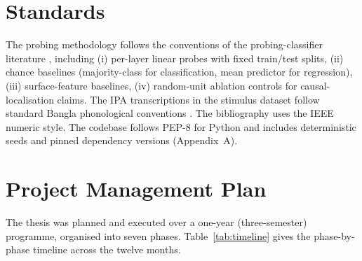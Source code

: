 \section{Standards}

The probing methodology follows the conventions of the probing-classifier literature \cite{conneau2018probing,belinkov2022probing,pimentel2020information}, including (i) per-layer linear probes with fixed train/test splits, (ii) chance baselines (majority-class for classification, mean predictor for regression), (iii) surface-feature baselines, (iv) random-unit ablation controls for causal-localisation claims. The IPA transcriptions in the stimulus dataset follow standard Bangla phonological conventions \cite{nag2014dyslexia}. The bibliography uses the IEEE numeric style. The codebase follows PEP-8 for Python and includes deterministic seeds and pinned dependency versions (Appendix~A).

\section{Project Management Plan}

The thesis was planned and executed over a one-year (three-semester) programme, organised into seven phases. Table~\ref{tab:timeline} gives the phase-by-phase timeline across the twelve months.

\begin{table}[H]
\centering
\caption{One-year thesis timeline. Phases overlap at their boundaries; writing runs in parallel with the final analysis phases.}
\label{tab:timeline}
\small
{}
\end{table}

